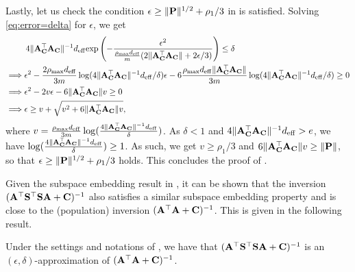\documentclass[11pt,a4paper]{article}
\begin{document}
Lastly, let us check the condition $\epsilon\geq \|\P\|^{1/2}+\rho_1/3$ in  is satisfied. 
Solving \eqref{eq:error=delta} for $\epsilon$, we get
\begin{align*}
& \quad \quad \ 4\|\A_{\C}^\top\A_{\C}\|^{-1}d_{\eff}\mathrm{exp} \left(-\frac{\epsilon^2}{\frac{\rho_{\max} d_{\eff}}{m}( 2\|\A_{\C}^\top\A_{\C}\|+2\epsilon/3)} \right)\leq\delta\\
&\Longrightarrow 
\epsilon^2-\frac{2\rho_{\max}  d_{\eff}}{3m}\log (4\|\A_{\C}^\top\A_{\C}\|^{-1}d_{\eff}/\delta) \epsilon-6\frac{\rho_{\max}  d_{\eff}\|\A_{\C}^\top\A_{\C}\|}{3m}\log(4\|\A_{\C}^\top\A_{\C}\|^{-1}d_{\eff}/\delta) \geq0 \\
&\Longrightarrow \epsilon^2-2v \epsilon-6\|\A_{\C}^\top\A_{\C}\|v\geq0 \\
&\Longrightarrow \epsilon\geq {v+\sqrt{v^2+6\|\A_{\C}^\top\A_{\C}\|v}} ,
\end{align*}
where $v=\frac{\rho_{\max}  d_{\eff}}{3m}\log(\frac{4\|\A_{\C}^\top\A_{\C}\|^{-1}d_{\eff}}{\delta}) $.
As $\delta<1$ and $4\|\A_{\C}^\top\A_{\C}\|^{-1}d_{\eff}>e$, we have $\log(\frac{4\|\A_{\C}^\top\A_{\C}\|^{-1}d_{\eff}}{\delta})\geq1$. 
As such, we get $v\geq\rho_1/3 $ and $6\|\A_{\C}^\top\A_{\C}\|v\geq \|\P\|$, so that $ \epsilon\geq \|\P\|^{1/2}+\rho_1/3 $ holds.
This concludes the proof of .
\qedwhite


Given the subspace embedding result in , it can be shown that the inversion $(\A^\top \S^\top \S\A+\C)^{-1}$ also satisfies a similar subspace embedding property and is close to the (population) inversion $(\A^\top \A + \C)^{-1}$. 
This is given in the following result.
\begin{lemma}\label{lemm:sub_embed_inversion}
Under the settings and notations of ,   
we have that $(\A^\top\S^\top \S\A+\C)^{-1}$ is an $(\epsilon,\delta)$-approximation of $(\A^\top\A+\C)^{-1}$. 
\end{lemma}
\end{document}
